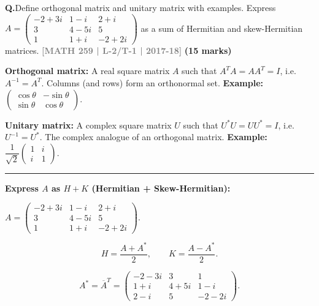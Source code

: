 \documentclass[12pt,a3paper]{article}
\newcommand{\yr}[1]{\hfill\textcolor{gray}{\small\textbf{[#1]}}}
\newcommand{\mk}[1]{\textcolor{orange!70!black}{\small\textbf{(#1 marks)}}}
\newcounter{qnum}
\newcommand{\Q}[1]{%
  \needspace{4\baselineskip}
  \refstepcounter{qnum}
  \vspace{6pt}
  \noindent\textbf{Q\theqnum.}\enspace #1\par
}
\begin{document}
\Q{Define orthogonal matrix and unitary matrix with examples. Express \\$A = \begin{pmatrix} -2+3i & 1-i & 2+i \\ 3 & 4-5i & 5 \\ 1 & 1+i & -2+2i \end{pmatrix}$ as a sum of Hermitian and skew-Hermitian matrices.
\yr{MATH 259 | L-2/T-1 | 2017-18} \mk{15}}

\begin{tcolorbox}[enhanced,breakable,
  colback=cG!4,colframe=cG,boxrule=0.8pt,arc=5pt,
  title={\textbf{Answer --- Orthogonal/Unitary Matrices; Hermitian + Skew-Hermitian Decomposition}},
  fonttitle=\bfseries\color{white},colbacktitle=cG]
 
\textbf{Orthogonal matrix:} A real square matrix $A$ such that $A^TA = AA^T = I$,
i.e.\ $A^{-1}=A^T$. Columns (and rows) form an orthonormal set.
\textbf{Example:} $\begin{pmatrix}\cos\theta&-\sin\theta\\\sin\theta&\cos\theta\end{pmatrix}$.
 
\medskip
\textbf{Unitary matrix:} A complex square matrix $U$ such that $U^*U = UU^* = I$,
i.e.\ $U^{-1}=U^*$. The complex analogue of an orthogonal matrix.
\textbf{Example:} $\dfrac{1}{\sqrt{2}}\begin{pmatrix}1&i\\i&1\end{pmatrix}$.
 
\medskip
\textcolor{cG}{\rule{\textwidth}{0.4pt}}
 
\textbf{Express $A$ as $H + K$ (Hermitian + Skew-Hermitian):}
 
$A = \begin{pmatrix}-2+3i&1-i&2+i\\3&4-5i&5\\1&1+i&-2+2i\end{pmatrix}$.
 
\[
H = \frac{A+A^*}{2}, \qquad K = \frac{A-A^*}{2}.
\]
 
\[
A^* = \overline{A}^T = \begin{pmatrix}-2-3i&3&1\\1+i&4+5i&1-i\\2-i&5&-2-2i\end{pmatrix}.
\]
 

\end{tcolorbox}
\end{document}
